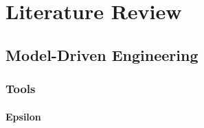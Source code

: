 
\chapter{Literature Review}
\label{LiteratureReview}


\section{Model-Driven Engineering}

\subsection{Tools}

\subsubsection{Epsilon}
\label{subsubsec:epsilon}